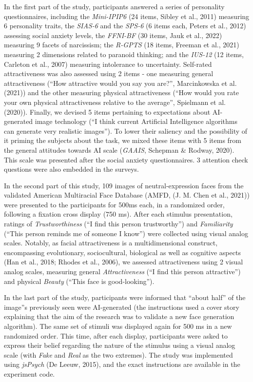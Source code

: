 \documentclass[
  man,floatsintext]{apa6}
\begin{document}
In the first part of the study, participants answered a series of personality questionnaires, including the \emph{Mini-IPIP6} (24 items, Sibley et al., 2011) measuring 6 personality traits, the \emph{SIAS-6} and the \emph{SPS-6} (6 items each, Peters et al., 2012) assessing social anxiety levels, the \emph{FFNI-BF} (30 items, Jauk et al., 2022) measuring 9 facets of narcissism; the \emph{R-GPTS} (18 items, Freeman et al., 2021) measuring 2 dimensions related to paranoid thinking; and the \emph{IUS-12} (12 items, Carleton et al., 2007) measuring intolerance to uncertainty. Self-rated attractiveness was also assessed using 2 items - one measuring general attractiveness (``How attractive would you say you are?'', Marcinkowska et al. (2021)) and the other measuring physical attractiveness (``How would you rate your own physical attractiveness relative to the average'', Spielmann et al. (2020)). Finally, we devised 5 items pertaining to expectations about AI-generated image technology (``I think current Artificial Intelligence algorithms can generate very realistic images''). To lower their saliency and the possibility of it priming the subjects about the task, we mixed these items with 5 items from the general attitudes towards AI scale (\emph{GAAIS}, Schepman \& Rodway, 2020). This scale was presented after the social anxiety questionnaires. 3 attention check questions were also embedded in the surveys.

In the second part of this study, 109 images of neutral-expression faces from the validated American Multiracial Face Database (AMFD, (J. M. Chen et al., 2021)) were presented to the participants for 500ms each, in a randomized order, following a fixation cross display (750 ms). After each stimulus presentation, ratings of \emph{Trustworthiness} (``I find this person trustworthy'') and \emph{Familiarity} (``This person reminds me of someone I know'') were collected using visual analog scales. Notably, as facial attractiveness is a multidimensional construct, encompassing evolutionary, sociocultural, biological as well as cognitive aspects (Han et al., 2018; Rhodes et al., 2006), we assessed attractiveness using 2 visual analog scales, measuring general \emph{Attractiveness} (``I find this person attractive'') and physical \emph{Beauty} (``This face is good-looking'').

In the last part of the study, participants were informed that ``about half'' of the image''s previously seen were AI-generated (the instructions used a cover story explaining that the aim of the research was to validate a new face generation algorithm). The same set of stimuli was displayed again for 500 ms in a new randomized order. This time, after each display, participants were asked to express their belief regarding the nature of the stimulus using a visual analog scale (with \emph{Fake} and \emph{Real} as the two extremes). The study was implemented using \emph{jsPsych} (De Leeuw, 2015), and the exact instructions are available in the experiment code.
\end{document}
